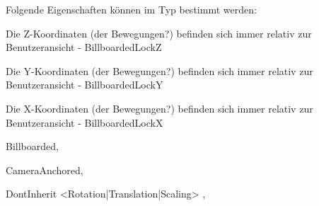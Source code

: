 Folgende Eigenschaften können im Typ bestimmt werden:
\item Die Z-Koordinaten (der Bewegungen?) befinden sich immer relativ zur Benutzeransicht - BillboardedLockZ
\item Die Y-Koordinaten (der Bewegungen?) befinden sich immer relativ zur Benutzeransicht - BillboardedLockY
\item Die X-Koordinaten (der Bewegungen?) befinden sich immer relativ zur Benutzeransicht - BillboardedLockX
\item Billboarded,
\item CameraAnchored,
\item DontInherit { <Rotation|Translation|Scaling> },


